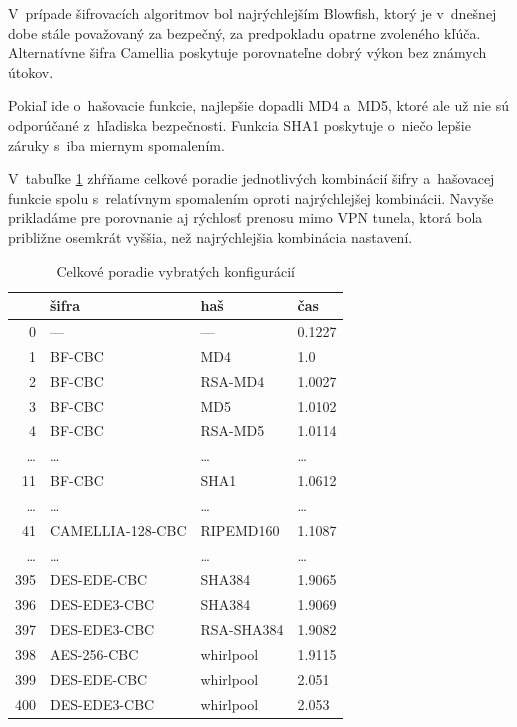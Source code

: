 \documentclass[12pt,a4paper]{article}
\begin{document}
V~prípade šifrovacích algoritmov bol najrýchlejším Blowfish, ktorý je
v~dnešnej dobe stále považovaný za bezpečný, za predpokladu opatrne
zvoleného kľúča. Alternatívne šifra Camellia poskytuje porovnateľne dobrý
výkon bez známych útokov.

Pokiaľ ide o~hašovacie funkcie, najlepšie dopadli MD4 a~MD5, ktoré ale už
nie sú odporúčané z~hľadiska bezpečnosti. Funkcia SHA1 poskytuje o~niečo
lepšie záruky s~iba miernym spomalením.

V~tabuľke \ref{tbl:config-chart} zhŕňame celkové poradie jednotlivých
kombinácií šifry a~hašovacej funkcie spolu s~relatívnym spomalením oproti
najrýchlejšej kombinácii. Navyše prikladáme pre porovnanie aj rýchlosť
prenosu mimo VPN tunela, ktorá bola približne osemkrát vyššia, než
najrýchlejšia kombinácia nastavení.

\begin{table}\centering
    \caption{Celkové poradie vybratých konfigurácií}
    \label{tbl:config-chart}
    \begin{tabular}{|r|l|l|l|}
        \hline
            \ & šifra & haš & čas \\ \hline
            0 & --- & --- & 0.1227 \\ \hline
            1 & BF-CBC & MD4 & 1.0 \\ \hline
            2 & BF-CBC & RSA-MD4 & 1.0027 \\ \hline
            3 & BF-CBC & MD5 & 1.0102 \\ \hline
            4 & BF-CBC & RSA-MD5 & 1.0114 \\ \hline
            \dots & \dots & \dots & \dots \\ \hline
            11 & BF-CBC & SHA1 & 1.0612 \\ \hline
            \dots & \dots & \dots & \dots \\ \hline
            41 & CAMELLIA-128-CBC & RIPEMD160 & 1.1087 \\ \hline
            \dots & \dots & \dots & \dots \\ \hline
            395 & DES-EDE-CBC & SHA384 & 1.9065 \\ \hline
            396 & DES-EDE3-CBC & SHA384 & 1.9069 \\ \hline
            397 & DES-EDE3-CBC & RSA-SHA384 & 1.9082 \\ \hline
            398 & AES-256-CBC & whirlpool & 1.9115 \\ \hline
            399 & DES-EDE-CBC & whirlpool & 2.051 \\ \hline
            400 & DES-EDE3-CBC & whirlpool & 2.053 \\ \hline
    \end{tabular}
\end{table}
\end{document}
